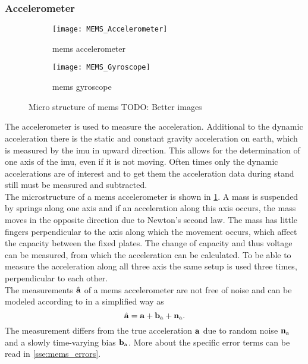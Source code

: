 \subsubsection{ Accelerometer}
\begin{figure}[htb]
	\centering
	\begin{subfigure}{0.48\textwidth}
		\centering
		\texttt{[image: MEMS\_Accelerometer]}
		\caption{\acrshort{mems} accelerometer}
		\label{fig:MEMS_Accelerometer}
	\end{subfigure}
	\begin{subfigure}{0.48\textwidth}
		\centering
		\texttt{[image: MEMS\_Gyroscope]}
		\caption{\acrshort{mems} gyroscope}
		\label{fig:MEMS_Gyroscope}
	\end{subfigure}
	\caption{Micro structure of \acrshort{mems} TODO: Better images}
	\label{fig:MEMS_design}
\end{figure}
The accelerometer is used to measure the acceleration.
Additional to the dynamic acceleration there is the static and constant gravity acceleration on earth, which is measured by the \gls{imu} in upward direction.
This allows for the determination of one axis of the \gls{imu}, even if it is not moving.
Often times only the dynamic accelerations are of interest and to get them the acceleration data during stand still must be measured and subtracted.\\
The microstructure of a \gls{mems} accelerometer is shown in \cref{fig:MEMS_Accelerometer}.
A mass is suspended by springs along one axis and if an acceleration along this axis occurs, the mass moves in the opposite direction due to Newton's second law.
The mass has little fingers perpendicular to the axis along which the movement occurs, which affect the capacity between the fixed plates.
The change of capacity and thus voltage can be measured, from which the acceleration can be calculated.
To be able to measure the acceleration along all three axis the same setup is used three times, perpendicular to each other.\\
The measurements $\hat{\vb{a}}$ of a \gls{mems} accelerometer are not free of noise and can be modeled according to \cite{Lefferts1982} in a simplified way as
\begin{equation}
	\hat{\vb{a}} = \vb{a} + \vb{b}_\mathrm{a} + \vb{n}_\mathrm{a}.
\end{equation}
The measurement differs from the true acceleration $\vb{a}$ due to random noise $\vb{n}_\mathrm{a}$ and a slowly time-varying bias $\vb{b}_\mathrm{a}$.
More about the specific error terms can be read in \cref{sse:mems_errors}.

